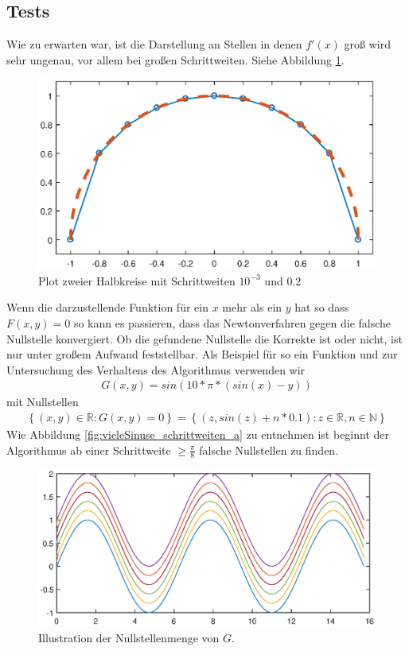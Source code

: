 \documentclass[a4paper,11pt,bibliography=totoc,listof=totoc,headinclude=true,cleardoublepage=empty,oneside]{scrartcl}
\begin{document}
\subsection{Tests}
Wie zu erwarten war, ist die Darstellung an Stellen in denen $f'(x)$ groß wird sehr ungenau, vor allem bei großen Schrittweiten. Siehe Abbildung \ref{fig:Halbkreis_a}.
\begin{figure}[h]
\centering
\includegraphics[width=0.85\linewidth]{plots/A/Halbkreis.eps}
\caption{Plot zweier Halbkreise mit Schrittweiten $10^{-3}$ und $0.2$}
\label{fig:Halbkreis_a}
\end{figure}
Wenn die darzustellende Funktion für ein $x$ mehr als ein $y$ hat so dass $F(x,y)=0$ so kann es passieren, dass das Newtonverfahren gegen die falsche Nullstelle konvergiert. Ob die gefundene Nullstelle die Korrekte ist oder nicht, ist nur unter großem Aufwand feststellbar. Als Beispiel für so ein Funktion und zur Untersuchung des Verhaltens des Algorithmus verwenden wir
\begin{align*}
G(x,y) = sin(10*\pi*(sin(x)-y))
\end{align*}
mit Nullstellen
\begin{align*}
\left\lbrace (x,y)\in\mathbb{R}: G(x,y)=0 \right\rbrace = \left\lbrace (z, sin(z)+n*0.1): z \in \mathbb{R}, n \in \mathbb{N} \right\rbrace
\end{align*}
Wie Abbildung \ref{fig:vieleSinuse_schrittweiten_a} zu entnehmen ist beginnt der Algorithmus ab einer Schrittweite $\geq \frac{\pi}{8}$ falsche Nullstellen zu finden.
\begin{figure}[h]
\centering
\includegraphics[width=1\linewidth]{plots/A/vieleSinuse.eps}
\caption{Illustration der Nullstellenmenge von $G$.}
\label{fig:vieleSinuse_a}
\end{figure}
\end{document}

